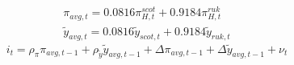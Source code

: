 \documentclass[12pt]{article}
\begin{document}
\begin{align}
    \pi_{avg, t} = 0.0816 \pi^{scot}_{H,t} + 0.9184 \pi^{ruk}_{H,t} \\
    \tilde{y}_{avg, t} = 0.0816 \tilde{y}_{scot, t} + 0.9184 \tilde{y}_{ruk, t}
\end{align}
\begin{equation}
    i_t = \rho_{\pi}\pi_{avg, t-1} + \rho_{\tilde y}\tilde{y}_{avg, t-1} + \Delta  \pi_{avg, t-1} + \Delta \tilde{y}_{avg, t-1} + \nu_t
\end{equation}
\end{document}
